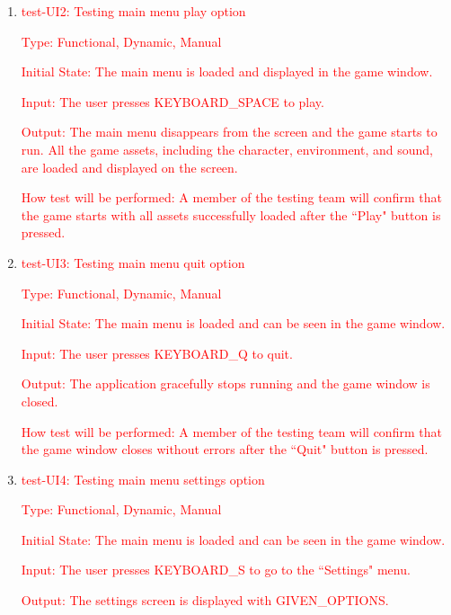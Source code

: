 \documentclass[12pt, titlepage]{article}
\begin{document}
\begin{enumerate}

\item{\textcolor{red}{test-UI2: Testing main menu play option\\}}

\textcolor{red}{Type: Functional, Dynamic, Manual}
					
\textcolor{red}{Initial State: The main menu is loaded and displayed in the game window.}
					
\textcolor{red}{Input: The user presses KEYBOARD\_SPACE to play.}
					
\textcolor{red}{Output: The main menu disappears from the screen and the game starts to run. All the game assets, including the character, environment, and sound, are loaded and displayed on the screen.}
					
\textcolor{red}{How test will be performed: A member of the testing team will confirm that the game starts with all assets successfully loaded after the ``Play" button is pressed.}

\item{\textcolor{red}{test-UI3: Testing main menu quit option}\\}

\textcolor{red}{Type: Functional, Dynamic, Manual}
					
\textcolor{red}{Initial State: The main menu is loaded and can be seen in the game window.}
					
\textcolor{red}{Input: The user presses KEYBOARD\_Q to quit.}
					
\textcolor{red}{Output: The application gracefully stops running and the game window is closed.}
					
\textcolor{red}{How test will be performed: A member of the testing team will confirm that the game window closes without errors after the ``Quit" button is pressed.}

\item{\textcolor{red}{test-UI4: Testing main menu settings option}\\}

\textcolor{red}{Type: Functional, Dynamic, Manual}
					
\textcolor{red}{Initial State: The main menu is loaded and can be seen in the game window.}
					
\textcolor{red}{Input: The user presses KEYBOARD\_S to go to the ``Settings" menu.}
					
\textcolor{red}{Output: The settings screen is displayed with GIVEN\_OPTIONS.}
					

\end{enumerate}
\end{document}
